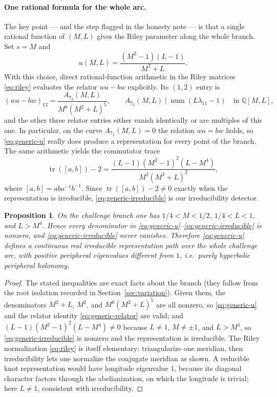 \documentclass[11pt]{article}
\newtheorem{proposition}{Proposition}
\theoremstyle{definition}
\newcommand{\Q}{\mathbb{Q}}
\begin{document}
\paragraph{One rational formula for the whole arc.}
The key point --- and the step flagged in the honesty note --- is that a single
rational function of $(M,L)$ gives the Riley parameter along the whole branch.
Set $s=M$ and
\begin{equation}\label{eq:generic-u}
 u(M,L)=\frac{(M^2-1)(L-1)}{M^2+L}.
\end{equation}
With this choice, direct rational-function arithmetic in the Riley matrices
\eqref{eq:riley} evaluates the relator $wa-bw$ explicitly.  Its $(1,2)$ entry is
\begin{equation}\label{eq:generic-relator}
 (wa-bw)_{12}=\frac{A_{7_2}(M,L)}{M^6(M^2+L)^5},
 \qquad
 A_{7_2}(M,L)\mid\operatorname{num}(L\lambda_{11}-1)
 \quad\text{in }\Q[M,L],
\end{equation}
and the other three relator entries either vanish identically or are multiples
of this one.  In particular, on the curve $A_{7_2}(M,L)=0$ the relation $wa=bw$
holds, so \eqref{eq:generic-u} really does produce a representation for every
point of the branch.  The same arithmetic yields the commutator trace
\begin{equation}\label{eq:generic-irreducible}
 \operatorname{tr}([a,b])-2=
 \frac{(L-1)(M^2-1)^2(L-M^4)}{M^2(M^2+L)^2},
\end{equation}
where $[a,b]=aba^{-1}b^{-1}$.  Since $\operatorname{tr}([a,b])-2\ne0$ exactly
when the representation is irreducible, \eqref{eq:generic-irreducible} is our
irreducibility detector.

\begin{proposition}\label{prop:arc-lift}
On the challenge branch one has $1/4<M<1/2$, $1/4<L<1$, and $L>M^4$.  Hence every
denominator in \eqref{eq:generic-u}--\eqref{eq:generic-irreducible} is nonzero,
and \eqref{eq:generic-irreducible} never vanishes.  Therefore \eqref{eq:generic-u}
defines a continuous real irreducible representation path over the whole
challenge arc, with positive peripheral eigenvalues different from $1$, i.e.\
purely hyperbolic peripheral holonomy.
\end{proposition}

\begin{proof}
The stated inequalities are exact facts about the branch (they follow from the
root isolation recorded in Section~\ref{sec:variation}).  Given them, the
denominators $M^2+L$, $M^2$, and $M^6(M^2+L)^5$ are all nonzero, so
\eqref{eq:generic-u} and the relator identity \eqref{eq:generic-relator} are
valid; and $(L-1)(M^2-1)^2(L-M^4)\ne0$ because $L\ne1$, $M\ne\pm1$, and
$L>M^4$, so \eqref{eq:generic-irreducible} is nonzero and the representation is
irreducible.  The Riley normalization \eqref{eq:riley} is itself elementary:
triangularize one meridian, then irreducibility lets one normalize the conjugate
meridian as shown.  A reducible knot representation would have longitude
eigenvalue $1$, because its diagonal character factors through the
abelianization, on which the longitude is trivial; here $L\ne1$, consistent with
irreducibility.
\end{proof}
\end{document}
